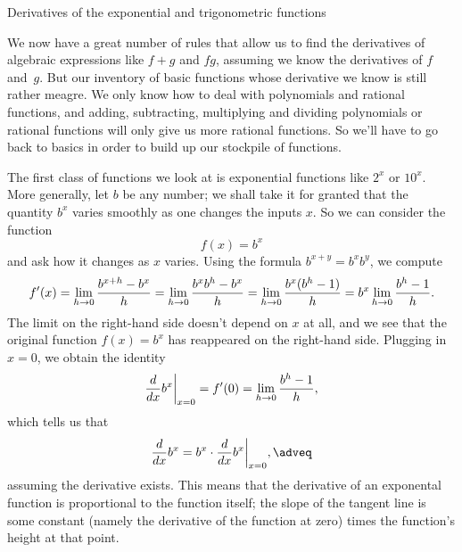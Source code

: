\advsect Derivatives of the exponential and trigonometric functions

We now have a great number of rules that allow us to find the derivatives of algebraic expressions like
$f+g$ and $fg$, assuming we know the derivatives of $f$ and~$g$. But our inventory of basic functions
whose derivative we know is still rather meagre. We only know how to deal with polynomials and rational
functions, and adding, subtracting, multiplying and dividing
polynomials or rational functions will only give us more rational functions.
So we'll have to go back to basics in order to build up our stockpile of functions.

The first class of functions we look at is exponential functions like $2^x$ or $10^x$.
More generally, let $b$ be any number; we shall take it for granted that the quantity $b^x$ varies smoothly
as one changes the inputs $x$. So we can consider the function
$$f(x) = b^x$$
and ask how it changes as $x$ varies.
Using the formula $b^{x+y} = b^xb^y$, we compute
$$f'(x) = \lim_{h\to 0} {b^{x+h} - b^x\over h}
= \lim_{h\to 0} {b^x b^h - b^x\over h} = \lim_{h\to 0} {b^x(b^h-1)\over h}
= b^x \lim_{h\to 0} {b^h-1\over h}.$$
The limit on the right-hand side doesn't depend on $x$ at all, and we see that the original function
$f(x) = b^x$ has reappeared on the right-hand side. Plugging in $x=0$, we obtain the identity
$${d \over dx} b^x \bigg|_{x=0} = f'(0) = \lim_{h\to 0} {b^h - 1\over h},$$
which tells us that
\edef\eqexpderiv{\the\eqcount}
$${d\over dx} b^x  = b^x \cdot {d \over dx} b^x \bigg|_{x=0},\adveq$$
assuming the derivative exists.
This means that the derivative of an exponental function is proportional to the function itself;
the slope of the tangent line is some constant (namely the derivative of the function at zero)
times the function's height at that point.

